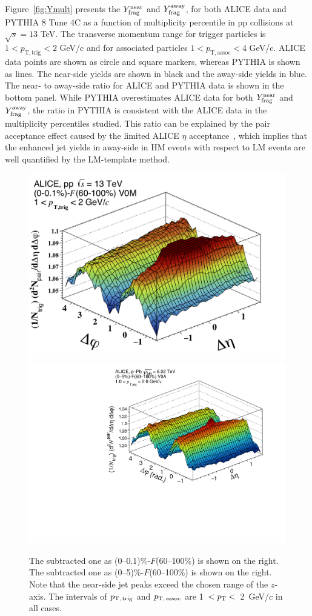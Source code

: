 Figure~\ref{fig:Ymult} presents the $Y^{\mathrm{near}}_{\rm{frag}}$ and $Y^{\mathrm{away}}_{\rm{frag}}$, for both ALICE data and PYTHIA 8 Tune 4C as a function of multiplicity percentile in pp collisions at $\sqrt{s}=13$ TeV. The transverse momentum range for trigger particles is $1<p_\mathrm{T,trig}<2$ GeV/c and for associated particles $1<p_\mathrm{T,assoc}<4$ GeV/c. ALICE data points are shown as circle and square markers, whereas PYTHIA is shown as lines. The near-side yields are shown in black and the away-side yields in blue.
The near- to away-side ratio for ALICE and PYTHIA data is shown in the bottom panel. While PYTHIA overestimates ALICE data for both $Y^{\mathrm{near}}_{\rm{frag}}$ and $Y^{\mathrm{away}}_{\rm{frag}}$, the ratio in PYTHIA is consistent with the ALICE data in the multiplicity percentiles studied. This ratio can be explained by the pair acceptance effect caused by the limited ALICE $\eta$ acceptance~\cite{PHENIX:2006gto}, which implies that the enhanced jet yields in away-side in HM events with respect to LM events are well quantified by the LM-template method.

\begin{figure}[h!]
		\includegraphics[width=0.5 \textwidth]{figures/CorrForAN_C_SUB_0_0_0_11.jpg}
  		\includegraphics[width=0.5 \textwidth]{figures/corr_sub_fit_1_0_2_pPb}
\caption{The subtracted one as (0--0.1)\%-$F$(60--100\%) is shown on the right. The subtracted one as (0--5)\%-$F$(60--100\%) is shown on the right. Note that the near-side jet peaks exceed the chosen range of the $z$-axis. The intervals of $p_\mathrm{T,\,trig}$ and $p_\mathrm{T,\,assoc}$ are 1~$<\it{p}_{\rm{T}}<$~2~GeV/$c$ in all cases.}
\label{fig:doubleridge}
\end{figure}

